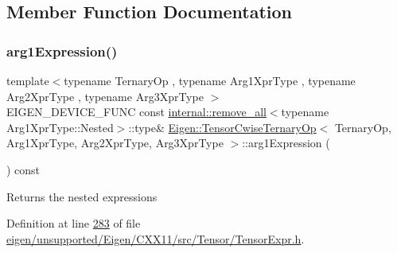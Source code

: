\subsection{Member Function Documentation}
\mbox{\label{class_eigen_1_1_tensor_cwise_ternary_op_a6e797469eff84e6b24dab5bf5f2c1da8}} 
\subsubsection{\texorpdfstring{arg1\+Expression()}{arg1Expression()}\hspace{0.1cm}{\footnotesize\ttfamily [1/2]}}
{\footnotesize\ttfamily template$<$typename Ternary\+Op , typename Arg1\+Xpr\+Type , typename Arg2\+Xpr\+Type , typename Arg3\+Xpr\+Type $>$ \\
E\+I\+G\+E\+N\+\_\+\+D\+E\+V\+I\+C\+E\+\_\+\+F\+U\+NC const \hyperlink{struct_eigen_1_1internal_1_1remove__all}{internal\+::remove\+\_\+all}$<$typename Arg1\+Xpr\+Type\+::\+Nested$>$\+::type\& \hyperlink{class_eigen_1_1_tensor_cwise_ternary_op}{Eigen\+::\+Tensor\+Cwise\+Ternary\+Op}$<$ Ternary\+Op, Arg1\+Xpr\+Type, Arg2\+Xpr\+Type, Arg3\+Xpr\+Type $>$\+::arg1\+Expression (\begin{DoxyParamCaption}{ }\end{DoxyParamCaption}) const\hspace{0.3cm}{\ttfamily [inline]}}

\begin{DoxyReturn}{Returns}
the nested expressions 
\end{DoxyReturn}


Definition at line \hyperlink{eigen_2unsupported_2_eigen_2_c_x_x11_2src_2_tensor_2_tensor_expr_8h_source_l00283}{283} of file \hyperlink{eigen_2unsupported_2_eigen_2_c_x_x11_2src_2_tensor_2_tensor_expr_8h_source}{eigen/unsupported/\+Eigen/\+C\+X\+X11/src/\+Tensor/\+Tensor\+Expr.\+h}.

\mbox{\label{class_eigen_1_1_tensor_cwise_ternary_op_a6e797469eff84e6b24dab5bf5f2c1da8}} 
